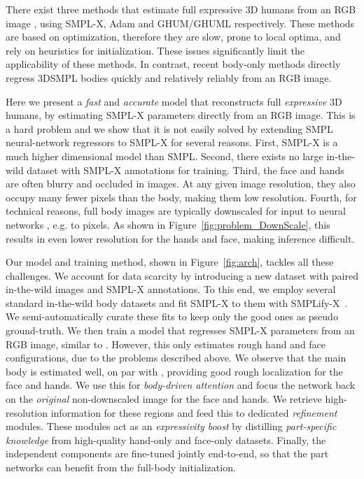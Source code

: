 \documentclass[runningheads]{llncs}
\newcommand{\smplx}{\mbox{SMPL-X}\xspace}
\newcommand{\smplifyx}{\mbox{SMPLify-X}\xspace}
\newcommand{\pseudogt}{pseudo \mbox{ground-truth}\xspace}
\newcommand{\adam}{\mbox{Adam}\xspace}
\newcommand{\ghum}{\mbox{GHUM}\xspace}
\newcommand{\ghuml}{\mbox{GHUML}\xspace}
\newcommand{\smpl}{\mbox{SMPL}\xspace}
\newcommand{\inthewild}{\mbox{in-the-wild}\xspace}
\newcommand{\threeD}{3D\xspace}
\newcommand{\eg}{e.g.\xspace}
\newcommand{\rgb}{\mbox{RGB}\xspace}
\begin{document}
There exist three methods that estimate full expressive \threeD humans from an
\rgb image \cite{Pavlakos_2019_CVPR,Xiang_2019_CVPR,Xu_2020_CVPR}, using \smplx, \adam and \ghum/\ghuml respectively.
These methods are based on optimization, therefore they are slow, prone to local optima, and rely on heuristics for initialization.
These issues significantly limit the applicability of these methods.
In contrast, recent body-only methods \cite{kanazawa_cvpr_2018,Kolotouros_2019_ICCV} directly regress \threeD \smpl bodies quickly and relatively reliably from an \rgb image.

Here we present a \emph{fast} and \emph{accurate} model that reconstructs full \emph{expressive} \threeD humans, by estimating \smplx parameters directly from an \rgb image. This is a hard problem and we show that it is not easily solved by extending \smpl neural-network regressors to \smplx for several reasons.
First, \smplx is a much higher dimensional model than \smpl.
Second, there exists no large \inthewild dataset with \smplx annotations for training.
Third, the face and hands are often blurry and occluded in images.
At any given image resolution, they also occupy many fewer pixels than the body, making them low resolution.
Fourth, for technical reasons, full body images are typically downscaled for input to neural networks \cite{krizhevsky2012imagenet}, \eg to  pixels.
As shown in Figure~\ref{fig:problem_DownScale}, this results in even lower resolution for the hands and face, making inference difficult.

Our model and training method, shown in Figure~\ref{fig:arch}, tackles all these challenges.
We account for data scarcity by introducing a new dataset with paired \inthewild images and \smplx annotations.
To this end, we employ several standard \inthewild body datasets \cite{andriluka20142d,johnson2010clustered,johnson2011learning,lin2014microsoft} and fit \smplx to them with \smplifyx~\cite{Pavlakos_2019_CVPR}.
We semi-automatically curate these fits to keep only the good ones as \pseudogt.
We then train a model that regresses \smplx parameters from an \rgb image, similar to \cite{kanazawa_cvpr_2018}.
However, this only estimates rough hand and face configurations, due to the problems described above.
We observe that the main body is estimated well, on par with \cite{kanazawa_cvpr_2018,Kolotouros_2019_ICCV}, providing good rough
localization for the face and hands.
We use this for \emph{body-driven attention} and focus the network back on the \emph{original} \mbox{non-downscaled} image for the face and hands.
We retrieve high-resolution information for these regions and feed this to dedicated \emph{refinement} modules.
These modules act as an \emph{expressivity boost} by distilling \emph{\mbox{part-specific} knowledge} from high-quality hand-only \cite{Freihand2019} and face-only \cite{liu2015celebA} datasets.
Finally, the independent components are fine-tuned jointly end-to-end,
so that the part networks can benefit from the full-body initialization.
\end{document}
